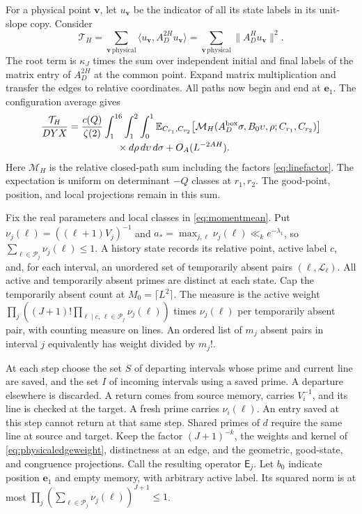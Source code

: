 \documentclass[11pt]{amsart}
\numberwithin{equation}{section}
\theoremstyle{remark}
\begin{document}
For a physical point $\mathbf v$, let $u_{\mathbf v}$ be the indicator
of all its state labels in its unit-slope copy. Consider
\[
 \mathcal T_H=\sum_{\mathbf v\,\text{physical}}
     \langle u_{\mathbf v},A_D^{2H}u_{\mathbf v}\rangle
 =\sum_{\mathbf v\,\text{physical}}\|A_D^Hu_{\mathbf v}\|^2.
\]
The root term is $\kappa_J$ times the sum over independent initial
and final labels of the matrix entry of $A_D^{2H}$ at the common
point. Expand matrix multiplication and transfer the edges to
relative coordinates. All paths now begin and end at $\mathbf e_1$.
The configuration average gives
\begin{equation}\label{eq:momentmean}
 \begin{aligned}
 \frac{\mathcal T_H}{DYX}&=\frac{c(Q)}{\zeta(2)}
  \int_1^{16}\int_1^2\int_0^1
     \mathbb E_{C_{r_1},C_{r_2}}\!\left[\mathcal M_H(A_D^{\rm box}\sigma,B_0\upsilon,\rho;C_{r_1},C_{r_2})\right]\\[-1pt]
     &\hspace{5em}\times d\rho\,d\upsilon\,d\sigma+O_A(L^{-2AH}).
 \end{aligned}
\end{equation}
Here $\mathcal M_H$ is the relative closed-path sum including the
factors \eqref{eq:linefactor}. The expectation is uniform on
determinant $-Q$ classes at $r_1,r_2$. The good-point, position,
and local projections remain in this sum.

Fix the real parameters and local classes in \eqref{eq:momentmean}.
Put $\nu_j(\ell)=((\ell+1)V_j)^{-1}$ and
$a_*=\max_{j,\ell}\nu_j(\ell)\ll_k e^{-\lambda_1}$, so
$\sum_{\ell\in\mathcal P_j}\nu_j(\ell)\le1$. A history state records
its relative point, active label $c$, and, for each interval, an
unordered set of temporarily absent pairs $(\ell,\mathcal L_\ell)$.
All active and temporarily absent primes are distinct at each state.
Cap the temporarily absent count at $M_0=\lceil L^2\rceil$.
The measure is the active weight
$\prod_j((J+1)!\prod_{\ell\mid c,\,\ell\in\mathcal P_j}\nu_j(\ell))$
times $\nu_j(\ell)$ per temporarily absent pair, with counting
measure on lines. An ordered list of $m_j$ absent pairs in interval
$j$ equivalently has weight divided by $m_j!$.

At each step choose the set $S$ of departing intervals whose prime
and current line are saved, and the set $I$ of incoming intervals
using a saved prime. A departure elsewhere is discarded. A return
comes from source memory, carries $V_i^{-1}$, and its line is checked
at the target. A fresh prime carries $\nu_i(\ell)$. An entry saved
at this step cannot return at that same step. Shared primes of $d$
require the same line at source and target. Keep the factor
$(J+1)^{-k}$, the weights and kernel of \eqref{eq:physicaledgeweight},
distinctness at an edge, and the geometric, good-state, and
congruence projections. Call the resulting operator $\mathsf E_j$.
Let $b_0$ indicate position $\mathbf e_1$ and empty memory, with
arbitrary active label. Its squared norm is at most
$\prod_j(\sum_{\ell\in\mathcal P_j}\nu_j(\ell))^{J+1}\le1$.
\end{document}
